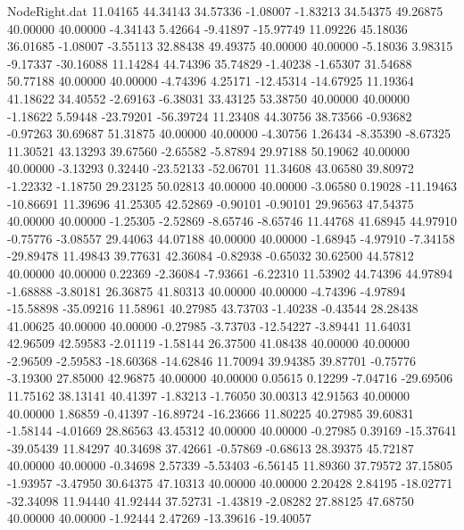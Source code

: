 \begin{filecontents}{NodeRight.dat}
  11.04165   44.34143   34.57336    -1.08007   -1.83213   34.54375   49.26875   40.00000   40.00000   -4.34143    5.42664   -9.41897  -15.97749
  11.09226   45.18036   36.01685    -1.08007   -3.55113   32.88438   49.49375   40.00000   40.00000   -5.18036    3.98315   -9.17337  -30.16088
  11.14284   44.74396   35.74829    -1.40238   -1.65307   31.54688   50.77188   40.00000   40.00000   -4.74396    4.25171  -12.45314  -14.67925
  11.19364   41.18622   34.40552    -2.69163   -6.38031   33.43125   53.38750   40.00000   40.00000   -1.18622    5.59448  -23.79201  -56.39724
  11.23408   44.30756   38.73566    -0.93682   -0.97263   30.69687   51.31875   40.00000   40.00000   -4.30756    1.26434   -8.35390   -8.67325
  11.30521   43.13293   39.67560    -2.65582   -5.87894   29.97188   50.19062   40.00000   40.00000   -3.13293    0.32440  -23.52133  -52.06701
  11.34608   43.06580   39.80972    -1.22332   -1.18750   29.23125   50.02813   40.00000   40.00000   -3.06580    0.19028  -11.19463  -10.86691
  11.39696   41.25305   42.52869    -0.90101   -0.90101   29.96563   47.54375   40.00000   40.00000   -1.25305   -2.52869   -8.65746   -8.65746
  11.44768   41.68945   44.97910    -0.75776   -3.08557   29.44063   44.07188   40.00000   40.00000   -1.68945   -4.97910   -7.34158  -29.89478
  11.49843   39.77631   42.36084    -0.82938   -0.65032   30.62500   44.57812   40.00000   40.00000    0.22369   -2.36084   -7.93661   -6.22310
  11.53902   44.74396   44.97894    -1.68888   -3.80181   26.36875   41.80313   40.00000   40.00000   -4.74396   -4.97894  -15.58898  -35.09216
  11.58961   40.27985   43.73703    -1.40238   -0.43544   28.28438   41.00625   40.00000   40.00000   -0.27985   -3.73703  -12.54227   -3.89441
  11.64031   42.96509   42.59583    -2.01119   -1.58144   26.37500   41.08438   40.00000   40.00000   -2.96509   -2.59583  -18.60368  -14.62846
  11.70094   39.94385   39.87701    -0.75776   -3.19300   27.85000   42.96875   40.00000   40.00000    0.05615    0.12299   -7.04716  -29.69506
  11.75162   38.13141   40.41397    -1.83213   -1.76050   30.00313   42.91563   40.00000   40.00000    1.86859   -0.41397  -16.89724  -16.23666
  11.80225   40.27985   39.60831    -1.58144   -4.01669   28.86563   43.45312   40.00000   40.00000   -0.27985    0.39169  -15.37641  -39.05439
  11.84297   40.34698   37.42661    -0.57869   -0.68613   28.39375   45.72187   40.00000   40.00000   -0.34698    2.57339   -5.53403   -6.56145
  11.89360   37.79572   37.15805    -1.93957   -3.47950   30.64375   47.10313   40.00000   40.00000    2.20428    2.84195  -18.02771  -32.34098
  11.94440   41.92444   37.52731    -1.43819   -2.08282   27.88125   47.68750   40.00000   40.00000   -1.92444    2.47269  -13.39616  -19.40057

\end{filecontents}
